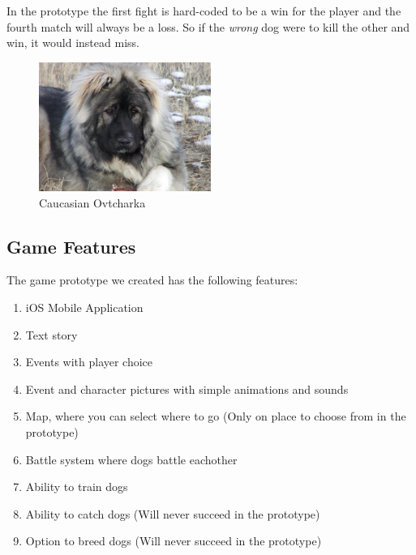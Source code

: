 In the prototype the first fight is hard-coded to be a win for the player and the fourth match will always be a loss. So if the \textit{wrong} dog were to kill the other and win, it would instead miss.\

\begin{figure}
	\centering
    \includegraphics[width=0.5\textwidth]{ovtcharka.jpg}
    \caption{Caucasian Ovtcharka}
    \label{fig:ovtcharka}
\end{figure}

\subsection{Game Features}
The game prototype we created has the following features:

\begin{enumerate}
	\item iOS Mobile Application
	\item Text story
	\item Events with player choice
	\item Event and character pictures with simple animations and sounds
	\item Map, where you can select where to go (Only on place to choose from in the prototype)
	\item Battle system where dogs battle eachother
	\item Ability to train dogs
	\item Ability to catch dogs (Will never succeed in the prototype)
	\item Option to breed dogs (Will never succeed in the prototype)
\end{enumerate}

